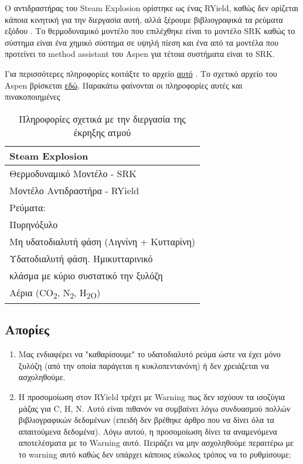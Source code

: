 \documentclass[11pt]{article}
\begin{document}
Ο αντιδραστήρας του Steam Explosion ορίστηκε ως ένας RYield, καθώς δεν ορίζεται κάποια κινητική για την διεργασία αυτή, αλλά ξέρουμε βιβλιογραφικά τα ρεύματα εξόδου \cite{fernandez-bolanosSteamexplosionOliveStones2001,fernandez-bolanosCharacterizationLigninObtained1999} . Το θερμοδυναμικό μοντέλο που επιλέχθηκε είναι το μοντέλο SRK καθώς το σύστημα είναι ένα χημικό σύστημα σε υψηλή πίεση και ένα από τα μοντέλα που προτείνει το method assistant του Aspen για τέτοια συστήματα είναι το SRK.

Για περισσότερες πληροφορίες κοιτάξτε το αρχείο \href{https://github.com/Vidianos-Giannitsis/Process-Design/blob/master/Aspen/steam\_explosion.org}{αυτό} . Το σχετικό αρχείο του Aspen βρίσκεται \href{https://github.com/Vidianos-Giannitsis/Process-Design/blob/master/Aspen/steam\_explosion\_3phases.apwz}{εδώ}. Παρακάτω φαίνονται οι πληροφορίες αυτές και πινακοποιημένες

\begin{table}[htbp]
\caption{Πληροφορίες σχετικά με την διεργασία της έκρηξης ατμού}
\centering
\begin{tabular}{l}
\hline
Steam Explosion\\
\hline
Θερμοδυναμικό Μοντέλο - SRK\\
Μοντέλο Αντιδραστήρα - RYield\\
Ρεύματα:\\
\hline
Πυρηνόξυλο\\
\hline
Μη υδατοδιαλυτή φάση  (Λιγνίνη + Κυτταρίνη)\\
\hline
Υδατοδιαλυτή φάση. Ημικυτταρινικό\\
κλάσμα με κύριο συστατικό την ξυλόζη\\
\hline
Αέρια (CO\textsubscript{2}, N\textsubscript{2}, H\textsubscript{2O})\\
\hline
\end{tabular}
\end{table}

\subsection{Απορίες}
\label{sec:org3bf3496}
\begin{enumerate}
\item Μας ενδιαφέρει να "καθαρίσουμε" το υδατοδιαλυτό ρεύμα ώστε να έχει μόνο ξυλόζη (από την οποία παράγεται η κυκλοπεντανόνη) ή δεν χρειάζεται να ασχοληθούμε.
\item Η προσομοίωση στον RYield τρέχει με Warning πως δεν ισχύουν τα ισοζύγια μάζας για C, H, N. Αυτό είναι πιθανόν να συμβαίνει λόγω συνδυασμού πολλών βιβλιογραφικών δεδομένων (επειδή δεν βρέθηκε άρθρο που να δίνει όλα τα απαιτούμενα δεδομένα). Λόγω αυτού, η προσομοίωση δίνει τα αναμενόμενα αποτελέσματα με το Warning αυτό. Πειράζει να μην ασχοληθούμε περαιτέρω με το warning αυτό καθώς δεν υπάρχει κάποιος εύκολος τρόπος να το ρυθμίσουμε;
\end{enumerate}
\end{document}
